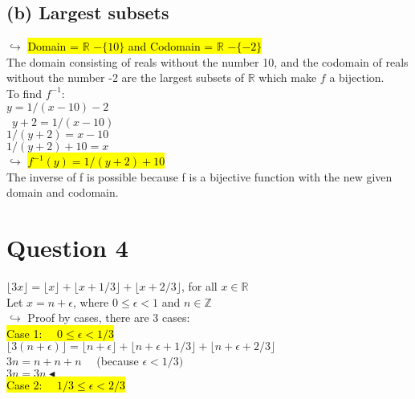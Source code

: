 \documentclass[a4paper, 12pt]{article}
\begin{document}
\subsection*{(b) Largest subsets}

$\hookrightarrow$ \hl{Domain = $\mathbb{R}$ $- \{10\}$ and Codomain = $\mathbb{R}$ $- \{-2\}$}\\

The domain consisting of reals without the number 10, and the codomain of reals without the number -2 are the largest subsets of $\mathbb{R}$ which make $f$ a bijection.\\

To find $f^{-1}$:\\

$y = 1/(x-10)-2$\\\
$y+2 = 1/(x-10)$\\
$1/(y+2) = x-10$\\
$1/(y+2) + 10 = x$\\

$\hookrightarrow$ \hl{$f^{-1}(y) = 1/(y+2)+10$}\\

The inverse of f is possible because f is a bijective function with the new given domain and codomain.

\section*{Question 4}

$\lfloor 3x \rfloor = \lfloor x \rfloor + \lfloor x + 1/3 \rfloor + \lfloor x + 2/3 \rfloor$, for all $x \in \mathbb{R}$\\

Let $x = n + \epsilon$, where $0 \leq \epsilon < 1$ and $n \in \mathbb{Z}$\\

$\hookrightarrow$ Proof by cases, there are 3 cases:\\

\hl{Case 1: $\quad 0 \leq \epsilon < 1/3$}\\

$\lfloor 3(n + \epsilon) \rfloor = \lfloor n + \epsilon \rfloor + \lfloor n + \epsilon + 1/3 \rfloor + \lfloor n + \epsilon + 2/3 \rfloor$\\

$3n = n + n + n \quad$ (because $\epsilon < 1/3)$\\
$3n = 3n \blacktriangleleft$\\

\hl{Case 2: $\quad 1/3 \leq \epsilon < 2/3$}\\
\end{document}

